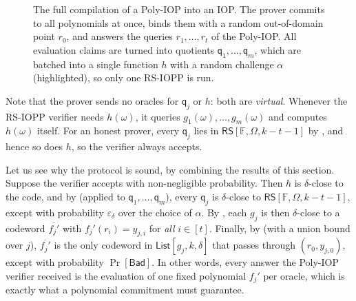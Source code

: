 \documentclass[../../book]{subfiles}
\begin{document}
\begin{figure}[h!]
{%
    }

    \caption{The full compilation of a Poly-IOP into an IOP. The prover commits to all polynomials at once, binds them with a random out-of-domain point $r_0$, and answers the queries $r_1, \dots, r_t$ of the Poly-IOP. All evaluation claims are turned into quotients $\mathsf{q}_1, \dots, \mathsf{q}_m$, which are batched into a single function $h$ with a random challenge $\alpha$ (highlighted), so only one RS-IOPP is run.}
    \label{fig:poly-iop-third-attempt}
\end{figure}

Note that the prover sends no oracles for $\mathsf{q}_j$ or $h$: both are \emph{virtual}.
Whenever the RS-IOPP verifier needs $h(\omega)$, it queries $g_1(\omega), \dots, g_m(\omega)$ and computes $h(\omega)$ itself.
For an honest prover, every $\mathsf{q}_j$ lies in $\mathsf{RS}[\mathbb{F}, \Omega, k - t - 1]$ by , and hence so does $h$, so the verifier always accepts.

Let us see why the protocol is sound, by combining the results of this section.
Suppose the verifier accepts with non-negligible probability.
Then $h$ is $\delta$-close to the code, and by  (applied to $\mathsf{q}_1, \dots, \mathsf{q}_m$), every $\mathsf{q}_j$ is $\delta$-close to $\mathsf{RS}[\mathbb{F}, \Omega, k - t - 1]$, except with probability $\varepsilon_\delta$ over the choice of $\alpha$.
By , each $g_j$ is then $\delta$-close to a codeword $\overline{f_j'}$ with $f_j'(r_i) = y_{j,i}$ for \emph{all} $i \in [t]$.
Finally, by  (with a union bound over $j$), $\overline{f_j'}$ is the only codeword in $\mathsf{List}[g_j, k, \delta]$ that passes through $(r_0, y_{j,0})$, except with probability $\Pr[\mathsf{Bad}]$.
In other words, every answer the Poly-IOP verifier received is the evaluation of one fixed polynomial $f_j'$ per oracle, which is exactly what a polynomial commitment must guarantee.
\end{document}
